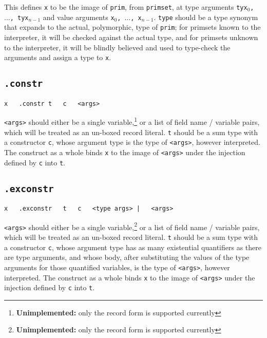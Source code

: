 \documentclass{report}
\newcommand\stringcode[1]{\texttt{#1}}
\newcommand\unimpl[1]{\footnote{\textbf{Unimplemented: }#1}}
\begin{document}
This defines \stringcode{x} to be the image of \stringcode{prim}, from \stringcode{primset},
at type arguments \stringcode{tyx$_0$, $\ldots$, tyx$_{n-1}$}
and value arguments \stringcode{x$_0$, $\ldots$, x$_{n-1}$}.
\stringcode{type} should be a type synonym that expands to the actual, polymorphic, type of \stringcode{prim};
for primsets known to the interpreter, it will be checked against the actual type,
and for primsets unknown to the interpreter,
it will be blindly believed and used to type-check the arguments and assign a type to \stringcode{x}.

\subsection{\stringcode{.constr}}

\begin{verbatim}
x	.constr	t	c	<args>
\end{verbatim}

\stringcode{<args>} should either be a single variable,\unimpl{only the record form is supported currently}
or a list of field name / variable pairs, which will be treated as an un-boxed record literal.
\stringcode{t} should be a sum type with a constructor \stringcode{c},
whose argument type is the type of \stringcode{<args>}, however interpreted.
The construct as a whole binds \stringcode{x} to the image of \stringcode{<args>} under the injection defined by \stringcode{c} into \stringcode{t}.

\subsection{\stringcode{.exconstr}}

\begin{verbatim}
x	.exconstr	t	c	<type args> |	<args>
\end{verbatim}

\stringcode{<args>} should either be a single variable,\unimpl{only the record form is supported currently}
or a list of field name / variable pairs, which will be treated as an un-boxed record literal.
\stringcode{t} should be a sum type with a constructor \stringcode{c},
whose argument type has as many existential quantifiers as there are type arguments,
and whose body, after substituting the values of the type arguments for those quantified variables,
is the type of \stringcode{<args>}, however interpreted.
The construct as a whole binds \stringcode{x} to the image of \stringcode{<args>} under the injection defined by \stringcode{c} into \stringcode{t}.
\end{document}

